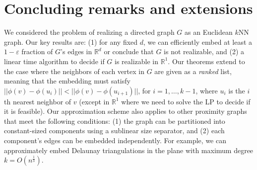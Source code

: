 \documentclass[english]{lipics-v2021}
\begin{document}
\section{Concluding remarks and extensions}

We considered the problem of realizing a directed graph $G$ as an Euclidean $k$NN graph. Our key results are: (1) for any fixed $d$, we can efficiently embed at least a $1 - \varepsilon$ fraction of $G$'s edges in $\mathbb{R}^d$ or conclude that $G$ is not realizable, and (2) a linear time algorithm to decide if $G$ is realizable in $\mathbb{R}^1$.
Our theorems extend to the case where the neighbors of each vertex in $G$ are given as a \emph{ranked} list, meaning that the embedding must satisfy $||\phi(v) - \phi(u_i)|| < || \phi(v) - \phi(u_{i+1})||$, for $i=1, \ldots, k-1$, where $u_i$ is the $i$th nearest neighbor of $v$ (except in $\mathbb{R}^1$ where we need to solve the LP to decide if it is feasible).
Our approximation scheme also applies to other proximity graphs that meet the following conditions: (1) the graph can be partitioned into constant-sized components using a sublinear size separator, and (2) each component's edges can be embedded independently. For example, we can approximately embed Delaunay triangulations in the plane with maximum degree $k = O(n^\frac{1}{3})$. 



\end{document}
